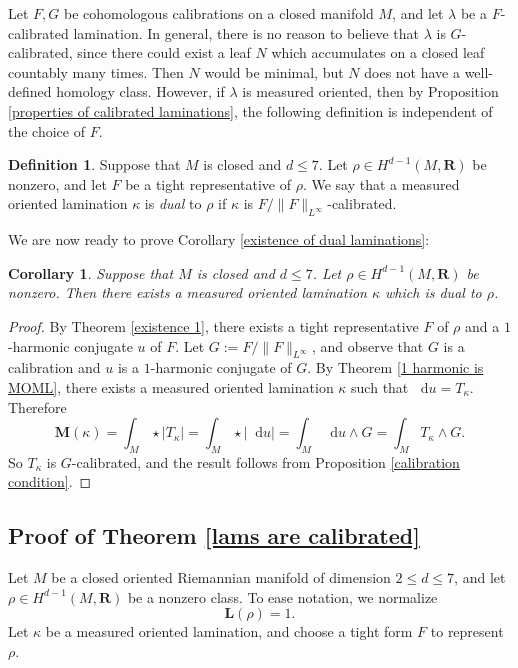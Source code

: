 \documentclass[reqno,11pt]{amsart}
\newcommand{\RR}{\mathbf{R}}
\newcommand*\dif{\mathop{}\!\mathrm{d}}
\newcommand{\Mass}{\mathbf M}
\newcommand{\Comass}{\mathbf L}
\newcommand{\dfn}[1]{\emph{#1}\index{#1}}
\newtheorem{corollary}[theorem]{Corollary}
\theoremstyle{definition}
\newtheorem{definition}[theorem]{Definition}
\numberwithin{equation}{section}
\begin{document}
Let $F, G$ be cohomologous calibrations on a closed manifold $M$, and let $\lambda$ be a $F$-calibrated lamination.
In general, there is no reason to believe that $\lambda$ is $G$-calibrated, since there could exist a leaf $N$ which accumulates on a closed leaf countably many times.
Then $N$ would be minimal, but $N$ does not have a well-defined homology class.
However, if $\lambda$ is measured oriented, then by Proposition \ref{properties of calibrated laminations}, the following definition is independent of the choice of $F$.

\begin{definition}
Suppose that $M$ is closed and $d \leq 7$.
Let $\rho \in H^{d - 1}(M, \RR)$ be nonzero, and let $F$ be a tight representative of $\rho$.
We say that a measured oriented lamination $\kappa$ is \dfn{dual} to $\rho$ if $\kappa$ is $F/\|F\|_{L^\infty}$-calibrated.
\end{definition}

We are now ready to prove Corollary \ref{existence of dual laminations}:

\begin{corollary}\label{existence of dual laminations proof}
Suppose that $M$ is closed and $d \leq 7$.
Let $\rho \in H^{d - 1}(M, \RR)$ be nonzero.
Then there exists a measured oriented lamination $\kappa$ which is dual to $\rho$.
\end{corollary}
\begin{proof}
By Theorem \ref{existence 1}, there exists a tight representative $F$ of $\rho$ and a $1$-harmonic conjugate $u$ of $F$.
Let $G := F/\|F\|_{L^\infty}$, and observe that $G$ is a calibration and $u$ is a $1$-harmonic conjugate of $G$.
By Theorem \ref{1 harmonic is MOML}, there exists a measured oriented lamination $\kappa$ such that $\dif u = T_\kappa$.
Therefore 
$$\Mass(\kappa) = \int_M \star |T_\kappa| = \int_M \star |\dif u| = \int_M \dif u \wedge G = \int_M T_\kappa \wedge G.$$
So $T_\kappa$ is $G$-calibrated, and the result follows from Proposition \ref{calibration condition}.
\end{proof}

\subsection{Proof of Theorem \ref{lams are calibrated}}\label{proof of Theorem B}
Let $M$ be a closed oriented Riemannian manifold of dimension $2 \leq d \leq 7$, and let $\rho \in H^{d - 1}(M, \RR)$ be a nonzero class.
To ease notation, we normalize
$$\Comass(\rho) = 1.$$
Let $\kappa$ be a measured oriented lamination, and choose a tight form $F$ to represent $\rho$.
\end{document}

